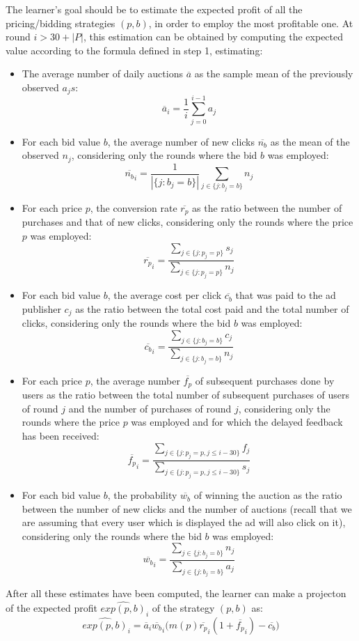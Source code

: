\documentclass[11pt]{article} %
\begin{document}
The learner's goal should be to estimate the expected profit of all the pricing/bidding strategies $(p,b)$, in order to employ the most profitable one. At round $i>30+|P|$, this estimation can be obtained by computing the expected value according to the formula defined in step 1, estimating:
\begin{itemize}
\item The average number of daily auctions $\overline a$ as the sample mean of the previously observed $a_js$: \[\overline a_i=\frac{1}{i}\sum_{j=0}^{i-1}{a_j}\]
\item For each bid value $b$, the average number of new clicks  $\overline{n_b}$ as the mean of the observed $n_j$, considering only the rounds where the bid $b$ was employed: \[\overline{n_b}_i=\frac{1}{|\{j: b_j=b\}|}\sum_{j\in\{j: b_j=b\}}{n_j}\]
\item For each price $p$, the conversion rate $\overline{r_p}$ as the ratio between the number of purchases and that of new clicks, considering only the rounds where the price $p$ was employed: \[\overline{r_p}_i=\frac{\sum_{j\in\{j:p_j=p\}}{s_j}}{\sum_{j\in\{j:p_j=p\}}{n_j}}\]
\item For each bid value $b$, the average cost per click $\overline{c_b}$ that was paid to the ad publisher $c_j$ as the ratio between the total cost paid and the total number of clicks,  considering only the rounds where the bid $b$ was employed:  \[\overline{c_b}_i=\frac{\sum_{j\in\{j:b_j=b\}}{c_j}}{\sum_{j\in\{j:b_j=b\}}{n_j}}\]
\item For each price $p$, the average number $\overline{f_p}$ of subsequent purchases done by users as the ratio between the total number of subsequent purchases of users of round $j$ and the number of purchases of round $j$, considering only the rounds where the price $p$ was employed and for which the delayed feedback has been received: \[\overline{f_p}_i=\frac{\sum_{j\in\{j:p_j=p, j\le i-30\}}{f_j}}{\sum_{j\in\{j:p_j=p, j\le i-30\}}{s_j}}\]
\item For each bid value $b$, the probability $\overline{w_b}$ of winning the auction as the ratio between the number of new clicks and the number of auctions (recall that we are assuming that every user which is displayed the ad will also click on it), considering only the rounds where the bid $b$ was employed:  \[\overline{w_b}_i=\frac{\sum_{j\in\{j:b_j=b\}}{n_j}}{\sum_{j\in\{j:b_j=b\}}{a_j}}\]
\end{itemize}
After all these estimates have been computed, the learner can make a projecton of the expected profit $\widehat{exp(p,b)}_i$ of the strategy $(p,b)$ as: \[\widehat{exp(p,b)}_i=\overline{a}_i\overline{w_b}_i\bigg(m(p)\overline{r_p}_i(1+\overline{f_p}_i) -\overline{c_b} \bigg) \]
\end{document}
